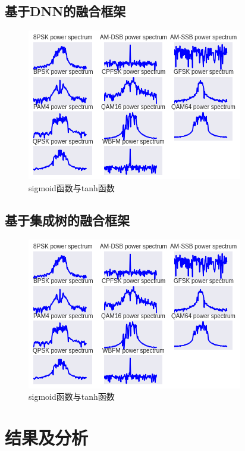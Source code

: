 \subsection{基于DNN的融合框架}

\begin{figure}[!h]
	\centering
	\includegraphics[scale=0.9]{figures/chapter_3/signal_view_2}
	\caption{sigmoid函数与tanh函数}\label{fig_2_2}
\end{figure}

\subsection{基于集成树的融合框架}

\begin{figure}[!h]
	\centering
	\includegraphics[scale=0.9]{figures/chapter_3/signal_view_2}
	\caption{sigmoid函数与tanh函数}\label{fig_2_2}
\end{figure}

\section{结果及分析}

